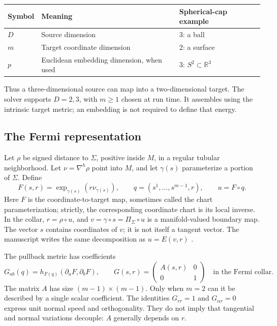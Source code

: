 \documentclass[11pt,a4paper]{article}
\newcommand{\R}{\mathbb R}
\begin{document}
\begin{center}
\begin{tabular}{lll}
\toprule
Symbol & Meaning & Spherical-cap example \\
\midrule
\(D\) & Source dimension & \(3\): a ball \\
\(m\) & Target coordinate dimension & \(2\): a surface \\
\(p\) & Euclidean embedding dimension, when used & \(3\): \(S^2\subset\R^3\) \\
\bottomrule
\end{tabular}
\end{center}
Thus a three-dimensional source can map into a two-dimensional target.
The solver supports \(D=2,3\), with \(m\geq1\) chosen at run time. It
assembles using the intrinsic target metric; an embedding is not required
to define that energy.

\subsection{The Fermi representation}
Let \(\rho\) be signed distance to \(\Sigma\), positive inside \(M\), in a
regular tubular neighborhood. Let \(\nu=\nabla^h\rho\) point into \(M\),
and let \(\gamma(s)\) parameterize a portion of \(\Sigma\). Define
\begin{equation}
 F(s,r)=\exp_{\gamma(s)}(r\nu_{\gamma(s)}),\qquad
 q=(s^1,\ldots,s^{m-1},r),\qquad u=F\circ q.
 \label{eq:fermi}
\end{equation}
Here \(F\) is the coordinate-to-target map, sometimes called the chart
parameterization; strictly, the corresponding coordinate chart is its local
inverse. In the collar, \(r=\rho\circ u\), and
\(v=\gamma\circ s=\Pi_\Sigma\circ u\) is a manifold-valued boundary map.
The vector \(s\) contains coordinates of \(v\); it is not itself a tangent
vector. The manuscript writes the same decomposition as \(u=E(v,r)\)
\cite{regularity}.

The pullback metric has coefficients
\begin{equation}
 G_{ab}(q)=h_{F(q)}(\partial_a F,\partial_b F),\qquad
 G(s,r)=\begin{pmatrix}A(s,r)&0\\0&1\end{pmatrix}
 \quad\text{in the Fermi collar}.
 \label{eq:metric}
\end{equation}
The matrix \(A\) has size \((m-1)\times(m-1)\). Only when \(m=2\) can it
be described by a single scalar coefficient. The identities
\(G_{rr}=1\) and \(G_{\alpha r}=0\) express unit normal speed and
orthogonality. They do not imply that tangential and normal variations
decouple: \(A\) generally depends on \(r\).
\end{document}

